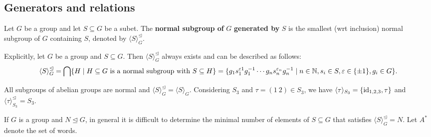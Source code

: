 \subsection{Generators and relations}
\begin{definition}[]
    Let $G$ be a group and let $S \subseteq G$ be a subet. The \textbf{normal subgroup of} $G$ \textbf{generated by} $S$ is the smallest (wrt inclusion) normal subgroup of $G$ containing $S$, denoted by $\langle S \rangle ^{\trianglelefteq }_G$.
\end{definition}
\begin{remark}
    Explicitly, let $G$ be a group and $S \subseteq G$. Then $\langle S \rangle ^{\trianglelefteq }_G$ always exists and can be described as follows: \[
    \langle S \rangle ^{\trianglelefteq }_G = \bigcap \{H \mid H \subseteq G  \text{ is a normal subgroup with } S \subseteq H\} = \{g_1 s_1 ^{\varepsilon 1}g_1 ^{-1} \cdots g_n s_n  ^{\varepsilon _n }g_n^{-1} \mid  n \in \mathbb{N}, s_i  \in S, \varepsilon  \in \{\pm 1\} , g_i  \in G\} .
    \] 
\end{remark}
\begin{example}
    All subgroups of abelian groups are normal and $\langle S \rangle _G ^{\trianglelefteq }= \langle S \rangle _G$. Considering $S_3$ and $\tau = (1\ 2)\in S_3$, we have $\langle \tau \rangle _{S_3}= \{\operatorname{id} _{1,2,3},\tau\} $ and $\langle \tau \rangle _{S_3}^{\trianglelefteq }= S_3$.
\end{example}
If $G$ is a group and $N \trianglelefteq G$, in general it is difficult to determine the minimal number of elements of $S \subseteq G$ that satisfies $\langle S \rangle _G ^{\trianglelefteq }= N$. Let $A^*$ denote the set of words.

